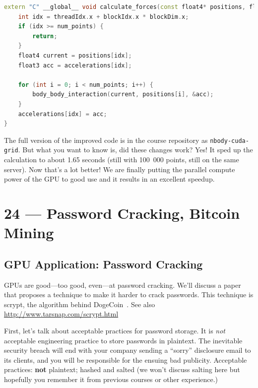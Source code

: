 \documentclass[a4paper]{report}
\begin{document}
\begin{lstlisting}[language=C++]
extern "C" __global__ void calculate_forces(const float4* positions, float3* accelerations, int num_points) {
    int idx = threadIdx.x + blockIdx.x * blockDim.x;
    if (idx >= num_points) {
        return;
    }
    float4 current = positions[idx];
    float3 acc = accelerations[idx];

    for (int i = 0; i < num_points; i++) {
        body_body_interaction(current, positions[i], &acc);
    }
    accelerations[idx] = acc;
}
\end{lstlisting}

The full version of the improved code is in the course repository as \texttt{nbody-cuda-grid}. But what you want to know is, did these changes work? Yes! It sped up the calculation to about 1.65 seconds (still with 100~000 points, still on the same server). Now that's a lot better! We are finally putting the parallel compute power of the GPU to good use and it results in an excellent speedup.









\chapter*{24 --- Password Cracking, Bitcoin Mining}


\section*{GPU Application: Password Cracking}

GPUs are good---too good, even---at password cracking. We'll discuss a paper
that proposes a technique to make it harder to crack passwords. This technique
is scrypt, the algorithm behind DogeCoin~\cite{scrypt}. See also \url{http://www.tarsnap.com/scrypt.html}

First, let's talk about acceptable practices for password storage. It is \emph{not}
acceptable engineering practice to store passwords in plaintext. The inevitable security
breach will end with your company sending a ``sorry'' disclosure email to its clients,
and you will be responsible for the ensuing bad publicity. Acceptable practices: {\bf not} plaintext; hashed and salted (we won't discuss salting here but hopefully you remember it from previous courses or other experience.)
\end{document}
